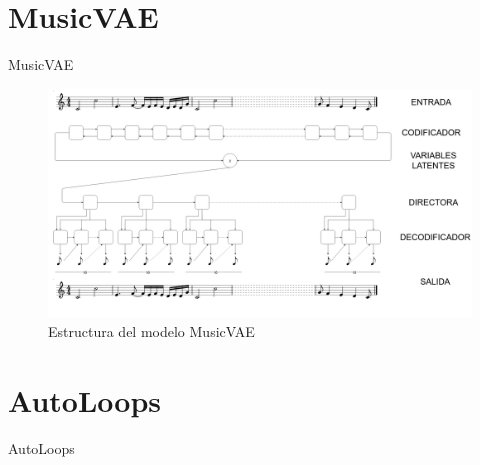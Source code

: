 \documentclass[spanish]{beamer}
\begin{document}
\section{MusicVAE}

\begin{frame}{MusicVAE}

\begin{figure}
\includegraphics[scale=0.16]{img/musicvae.png}
\caption{Estructura del modelo MusicVAE}
\end{figure}


\end{frame}

\section{AutoLoops}

\begin{frame}{AutoLoops}
\end{frame}
\end{document}
